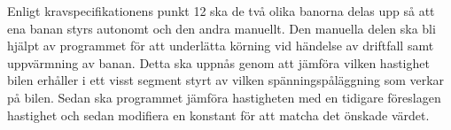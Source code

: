 Enligt kravspecifikationens punkt 12 ska de två olika banorna delas upp så att
ena banan styrs autonomt och den andra manuellt.  Den manuella delen ska bli
hjälpt av programmet för att underlätta körning vid händelse av driftfall samt
uppvärmning av banan.  Detta ska uppnås genom att jämföra vilken hastighet bilen
erhåller i ett visst segment styrt av vilken spänningspåläggning som verkar på
bilen.  Sedan ska programmet jämföra hastigheten med en tidigare föreslagen
hastighet och sedan modifiera en konstant för att matcha det önskade värdet.


